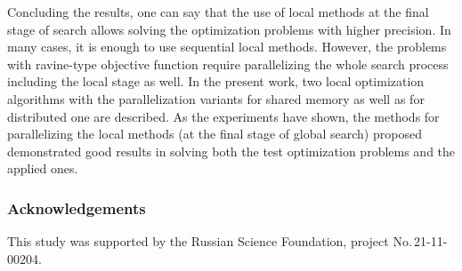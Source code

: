 \documentclass[runningheads]{llncs}
\begin{document}
Concluding the results, one can say that the use of local methods at the final stage of search allows solving the optimization problems with higher precision. In many cases, it is enough to use sequential local methods. However, the problems with ravine-type objective function require parallelizing the whole search process including the local stage as well. In the present work, two local optimization algorithms with the parallelization variants for shared memory as well as for distributed one are described. As the experiments have shown, the methods for parallelizing the local methods (at the final stage of global search) proposed demonstrated good results in solving both the test optimization problems and the applied ones. 

\subsubsection{Acknowledgements} This study was supported by the Russian Science Foundation, project No.\,21-11-00204.

%
%
%


%
\end{document}
